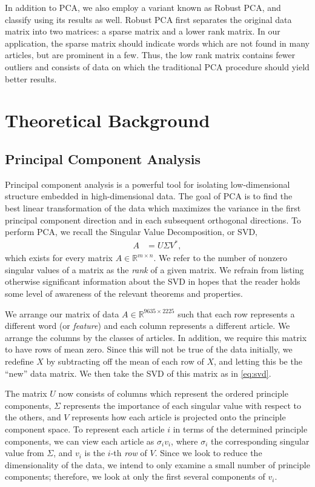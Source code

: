 \documentclass[12pt]{article}
\newcommand{\R}{\mathbb{R}}
\begin{document}
In addition to PCA, we also employ a variant known as Robust PCA, and classify using its results as well. Robust PCA first separates the original data matrix into two matrices: a sparse matrix and a lower rank matrix. In our application, the sparse matrix should indicate words which are not found in many articles, but are prominent in a few. Thus, the low rank matrix contains fewer outliers  and consists of data on which the traditional PCA procedure should yield better results. 


\section{Theoretical Background}

\subsection{Principal Component Analysis
}
Principal component analysis is a powerful tool for isolating low-dimensional
structure embedded in high-dimensional data. The goal of PCA is to find the best
linear transformation of the data which maximizes the variance in the first principal component direction and in each subsequent orthogonal directions. To perform PCA, we recall the Singular Value Decomposition, or SVD, 
\begin{align} 
A &= U \Sigma V^*,
\label{eq:svd}
\end{align}
which exists for every matrix $A \in \R^{m \times n}.$ We refer to the number of nonzero singular values of a matrix as the \emph{rank} of a given matrix. We refrain from listing otherwise significant information about the SVD in hopes that the reader holds some level of awareness of the relevant theorems and properties. 

We arrange our matrix of data $A \in \R^{ 9635 \times 2225 } $ such that each row represents a different word (or \emph{feature}) and each column represents a different article. We arrange the columns by the classes of articles. In addition, we require this matrix to have rows of mean zero. Since this will not be true of the data initially, we redefine $X$ by subtracting off the mean of each row of $X$, and letting this be the ``new'' data matrix. We then take the SVD of this matrix as in \eqref{eq:svd}.

The matrix $U$ now consists of columns which represent the ordered principle components, $\Sigma$ represents the importance of each singular value with respect to the others, and $V$ represents how each article is projected onto the principle component space. To represent each article $i$ in terms of the determined principle components, we can view each article as $\sigma_i v_i $, where $\sigma_i$ the corresponding singular value from $\Sigma$, and $v_i$ is the $i$-th \emph{row} of $V$. Since we look to reduce the dimensionality of the data, we intend to only examine a small number of principle components; therefore, we look at only the first several components of $v_i$.
\end{document}
